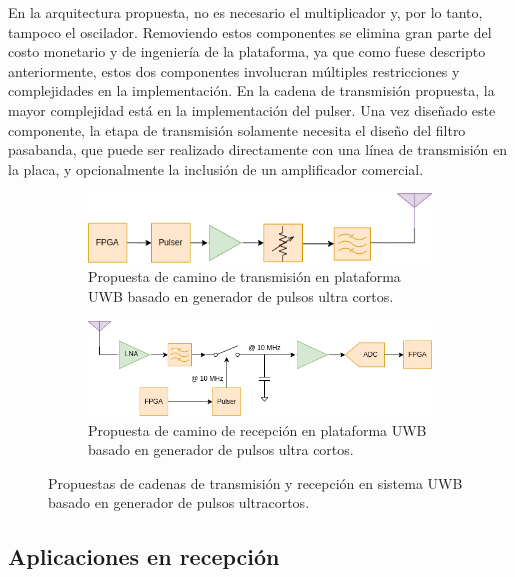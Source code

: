 En la arquitectura propuesta, no es necesario el multiplicador y, por lo tanto,
tampoco el oscilador. Removiendo estos componentes se elimina gran parte del
costo monetario y de ingeniería de la plataforma, ya que como fuese descripto
anteriormente, estos dos componentes involucran múltiples restricciones y
complejidades en la implementación. En la cadena de transmisión propuesta, la
mayor complejidad está en la implementación del pulser. Una vez diseñado este
componente, la etapa de transmisión solamente necesita el diseño del filtro
pasabanda, que puede ser realizado directamente con una línea de transmisión en
la placa, y opcionalmente la inclusión de un amplificador comercial.

\begin{figure}[t]
    \centering
    \begin{subfigure}[b]{0.45\textwidth}
        \centering
        \includegraphics[width=\textwidth]{images/proposed_uwb_tx_path.drawio.png}
        \caption{Propuesta de camino de transmisión en plataforma UWB basado en
        generador de pulsos ultra cortos.}
        \label{fig:proposed_uwb_tx_path}
    \end{subfigure}
    \hfill
    \begin{subfigure}[b]{0.45\textwidth}
        \centering
        \includegraphics[width=\textwidth]{images/proposed_uwb_rx_path.drawio.png}
        \caption{Propuesta de camino de recepción en plataforma UWB basado en
        generador de pulsos ultra cortos.}
        \label{fig:proposed_uwb_rx_path}
    \end{subfigure}
    \caption{Propuestas de cadenas de transmisión y recepción en sistema UWB
    basado en generador de pulsos ultracortos.}
    \label{fig:uwb_system_block_diagram}
\end{figure}

\subsection{Aplicaciones en recepción}

